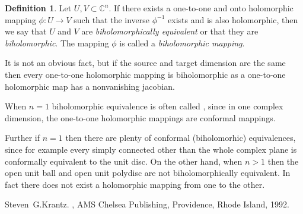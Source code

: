 \documentclass[12pt]{article}
\theoremstyle{theorem}
\theoremstyle{definition}
\newtheorem*{defn}{Definition}
\begin{document}
\begin{defn}
Let $U,V \subset {\mathbb{C}}^n$.  If there exists a one-to-one and onto
holomorphic mapping $\phi \colon U \to V$ such that the inverse $\phi^{-1}$
exists and is also holomorphic, then we say that
$U$ and $V$ are {\em biholomorphically equivalent} or that they are
{\em biholomorphic}.  The mapping $\phi$ is called a {\em biholomorphic mapping}.
\end{defn}

It is not an obvious fact, but if the source and target dimension are the same then every one-to-one holomorphic mapping is biholomorphic as a one-to-one holomorphic map has a nonvanishing jacobian.

When $n=1$ biholomorphic equivalence is often called , since in one complex
dimension, the one-to-one holomorphic mappings are conformal mappings.

Further if $n=1$ then there are plenty of conformal (biholomorhic) equivalences,
since for example every simply connected  other than the whole complex plane is conformally
equivalent to the unit disc.  On the other hand,
when $n > 1$ then the open unit ball and open unit polydisc
are not biholomorphically equivalent.  In fact there does not exist
a  holomorphic mapping from one to the other.

\begin{thebibliography}{9}
Steven~G.\@ Krantz.
{\em {}},
AMS Chelsea Publishing, Providence, Rhode Island, 1992.
\end{thebibliography}
\end{document}
